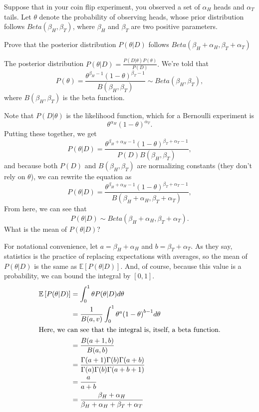 \documentclass[11pt,largemargins]{homework}
\begin{document}
\maketitle
\question
Suppose that in your coin flip experiment, you observed a set of $\alpha_H$ heads and $\alpha_T$ tails. Let $\theta$ denote the probability of observing heads, whose prior distribution follows $Beta(\beta_H, \beta_T)$, where $\beta_H$ and $\beta_T$ are two positive parameters. 
\begin{alphaparts}
    \questionpart
    Prove that the posterior distribution $P(\theta|D)$ follows $Beta(\beta_H + \alpha_H, \beta_T + \alpha_T)$

	The posterior distribution $P(\theta|D)=\frac{P(D|\theta)P(\theta)}{P(D)}.$ We're told that $$P(\theta)=\frac{\theta^{\beta_H-1}{(1-\theta)}^{\beta_T-1}}{B(\beta_H, \beta_T)} \sim Beta(\beta_H, \beta_T),$$ where $B(\beta_H, \beta_T)$ is the beta function.

	Note that $P(D|\theta)$ is the likelihood function, which for a Bernoulli experiment is $$\theta^{\alpha_H}{(1-\theta)}^{\alpha_T}.$$
	Putting these together, we get $$P(\theta|D)=\frac{\theta^{\beta_H+\alpha_H-1}{(1-\theta)}^{\beta_T+\alpha_T-1}}{P(D)B(\beta_H, \beta_T)},$$
	and because both $P(D)$ and $B(\beta_H, \beta_T)$ are normalizing constants (they don't rely on $\theta$), we can rewrite the equation as 
	$$P(\theta|D)=\frac{\theta^{\beta_H+\alpha_H-1}{(1-\theta)}^{\beta_T+\alpha_T-1}}{B(\beta_H+\alpha_H, \beta_T+\alpha_T)},$$
	From here, we can see that $$P(\theta|D)\sim Beta(\beta_H+\alpha_H, \beta_T+\alpha_T).$$ 
	\questionpart
	What is the mean of $P(\theta|D)$?

	For notational convenience, let $a=\beta_H+\alpha_H$ and $b=\beta_T+\alpha_T$. As they say, statistics is the practice of replacing expectations with averages, so the mean of $P(\theta|D)$ is the same as $\mathbb{E}\left[ P(\theta|D)\right].$ And, of course, because this value is a probability, we can bound the integral by $[0, 1].$
	\begin{align}
		\mathbb{E}\left[ P(\theta|D)\right] &= \int_{0}^1{\theta P(\theta|D)d\theta} \\
											&= \frac{1}{B(a, v)}\int_0^1{\theta^a{(1-\theta)}^{b-1}d\theta}\\
	\intertext{Here, we can see that the integral is, itself, a beta function.}
	&= \frac{B(a+1, b)}{B(a, b)}\\
	&= \frac{\Gamma(a+1)\Gamma(b)\Gamma(a+b)}{\Gamma(a)\Gamma(b)\Gamma(a+b+1)}\\
	&= \frac{a}{a+b}\\
	&= \frac{\beta_H+\alpha_H}{\beta_H+\alpha_H+\beta_T+\alpha_T}
	\end{align}


\end{alphaparts}
\end{document}
